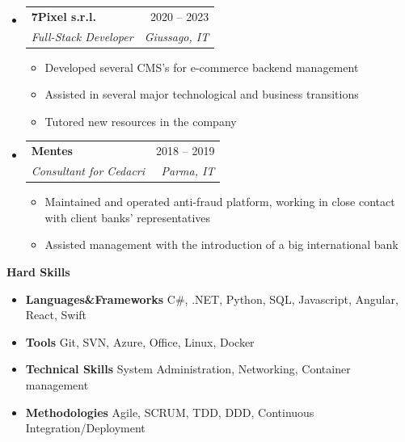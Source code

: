 \documentclass[letterpaper,12pt]{article}[leftmargin=*]
\makeatletter
\def \entryspacing {-0pt}
\renewcommand{\section}[2]{\vspace{5pt}
  \colorbox{secondary}{\color{white}\raggedbottom\normalsize\textbf{{#1}{\hspace{7pt}#2}}}
}
\newcommand{\resumeEntryStart}{\begin{itemize}[leftmargin=2.5mm]}
\newcommand{\resumeEntryEnd}{\end{itemize}\vspace{\entryspacing}}
\newcommand{\resumeItemListStart}{\begin{itemize}[leftmargin=4.5mm]}
\newcommand{\resumeItemListEnd}{\end{itemize}}
\newcommand{\resumeItem}[1]{
  \item\small{
    {#1 \vspace{-2pt}}
  }
}
\newcommand{\resumeEntryTSDL}[4]{
  \vspace{-1pt}\item[]
    \begin{tabularx}{0.97\textwidth}{X@{\hspace{60pt}}r}
      \textbf{\color{primary}#1} & {\firabook\color{accent}\small#2} \\
      \textit{\color{accent}\small#3} & \textit{\color{accent}\small#4} \\
    \end{tabularx}\vspace{-6pt}
}
\newcommand{\resumeEntryTD}[2]{
  \vspace{-1pt}\item[]
    \begin{tabularx}{0.97\textwidth}{X@{\hspace{60pt}}r}
      \textbf{\color{primary}#1} & {\firabook\color{accent}\small#2} \\
    \end{tabularx}\vspace{-6pt}
}
\newcommand{\resumeEntryS}[2]{
  \item[]\small{
    \textbf{\color{primary}#1 }{ #2 \vspace{-6pt}}
  }
}
\makeatother
\begin{document}
  \resumeEntryStart
    \resumeEntryTSDL
      {7Pixel s.r.l.}{2020 -- 2023}
      {Full-Stack Developer}{Giussago, IT}
    \resumeItemListStart
        \resumeItem {Developed several CMS's for e-commerce backend management}
        \resumeItem {Assisted in several major technological and business transitions}
        \resumeItem {Tutored new resources in the company}
    \resumeItemListEnd
  \resumeEntryEnd

  \resumeEntryStart
    \resumeEntryTSDL
      {Mentes}{2018 -- 2019}
      {Consultant for Cedacri}{Parma, IT}
    \resumeItemListStart
      \resumeItem {Maintained and operated anti-fraud platform, working in close contact with client banks' representatives}
      \resumeItem {Assisted management with the introduction of a big international bank}
    \resumeItemListEnd
  \resumeEntryEnd






\section{\faGears}{Hard Skills}
 \resumeEntryStart
  \resumeEntryS{Languages\&Frameworks }{C\#, .NET, Python, SQL, Javascript, Angular, React, Swift}
  \resumeEntryS{Tools } {Git, SVN, Azure, Office, Linux, Docker}
  \resumeEntryS{Technical Skills } {System Administration, Networking, Container management}
  \resumeEntryS{Methodologies } {Agile, SCRUM, TDD, DDD, Continuous Integration/Deployment}
 \resumeEntryEnd
\end{document}
